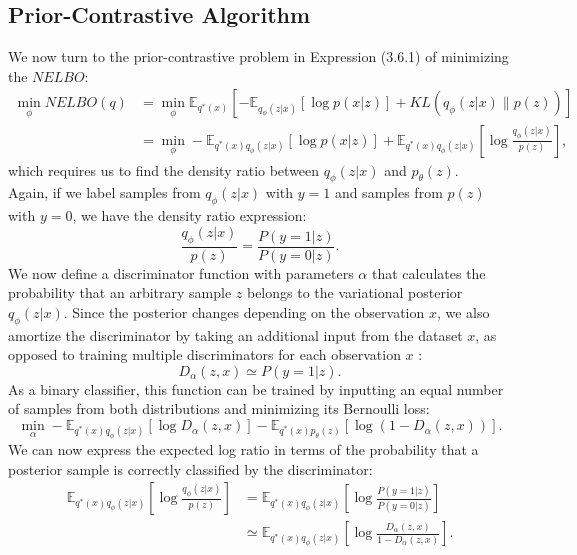 \documentclass[honours,12pt]{unswthesis}
\newcommand{\E}{\mathbb{E}}
\numberwithin{equation}{section}
\theoremstyle{definition}
\begin{document}
\subsection{Prior-Contrastive Algorithm}\label{sec:4.1.2}
We now turn to the prior-contrastive problem in Expression (3.6.1) of minimizing the $NELBO$:
\begin{align}
\min_{\phi} NELBO(q)&=\min_{\phi}\mathbb{E}_{q^*(x)}\left[-\E_{q_\phi(z|x)}[\log p(x|z)]+KL(q_\phi(z|x)\|p(z))\right]\nonumber\\
&=\min_\phi -\mathbb{E}_{q^*(x)q_\phi(z|x)}[\log p(x|z)]+\mathbb{E}_{q^*(x)q_\phi(z|x)}\left[\log \frac{q_\phi(z|x)}{p(z)}\right],
\end{align}
which requires us to find the density ratio between $q_\phi(z|x)$ and $p_\theta(z)$.\\
Again, if we label samples from $q_\phi(z|x)$ with $y=1$ and samples from $p(z)$ with $y=0$, we have the density ratio expression:
\[\frac{q_\phi(z|x)}{p(z)}=\frac{P(y=1|z)}{P(y=0|z)}.\]
We now define a discriminator function with parameters $\alpha$ that calculates the probability that an arbitrary sample $z$ belongs to the variational posterior $q_\phi(z|x)$. Since the posterior changes depending on the observation $x$, we also amortize the discriminator by taking an additional input from the dataset $x$, as opposed to training multiple discriminators for each observation $x$ :
\[D_\alpha(z,x)\simeq P(y=1|z).\]
As a binary classifier, this function can be trained by inputting an equal number of samples from both distributions and minimizing its Bernoulli loss:
\begin{equation}
\min_\alpha -\mathbb{E}_{q^*(x)q_\phi(z|x)}[\log D_\alpha(z,x)]-\mathbb{E}_{q^*(x)p_\theta(z)}[\log (1-D_\alpha(z,x))].
\end{equation}
We can now express the expected log ratio in terms of the probability that a posterior sample is correctly classified by the discriminator:
\begin{align*}
\mathbb{E}_{q^*(x)q_\phi(z|x)}\left[\log \frac{q_\phi(z|x)}{p(z)}\right]&=\mathbb{E}_{q^*(x)q_\phi(z|x)}\left[\log \frac{P(y=1|z)}{P(y=0|z)}\right]\\
&\simeq \mathbb{E}_{q^*(x)q_\phi(z|x)}\left[\log \frac{D_\alpha(z,x)}{1-D_\alpha(z,x)}\right].
\end{align*}
\end{document}
